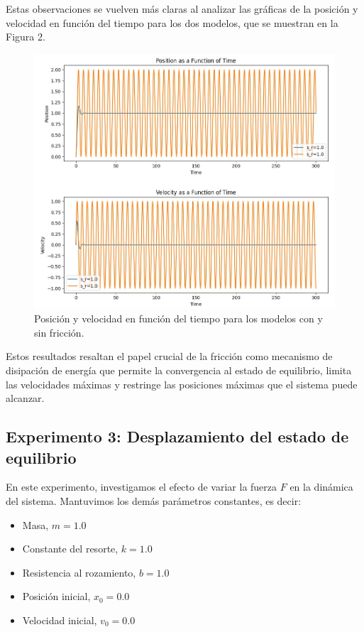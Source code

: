\documentclass[]{article}
\begin{document}
Estas observaciones se vuelven más claras al analizar las gráficas de la posición y velocidad en función del tiempo para los dos modelos, que se muestran en la Figura 2. 


\begin{figure}[H]
\centering
\includegraphics[width=\textwidth]{../assets/figure_2_friction.jpeg}
\caption{Posición y velocidad en función del tiempo para los modelos con y sin fricción.}
\end{figure}

Estos resultados resaltan el papel crucial de la fricción como mecanismo de disipación de energía que permite la convergencia al estado de equilibrio, limita las velocidades máximas y restringe las posiciones máximas que el sistema puede alcanzar.

\subsection{Experimento 3: Desplazamiento del estado de equilibrio}

En este experimento, investigamos el efecto de variar la fuerza $F$ en la dinámica del sistema. Mantuvimos los demás parámetros constantes, es decir:

\begin{itemize}
\item Masa, $m = 1.0$
\item Constante del resorte, $k = 1.0$
\item Resistencia al rozamiento, $b = 1.0$
\item Posición inicial, $x_0 = 0.0$
\item Velocidad inicial, $v_0 = 0.0$
\end{itemize}
\end{document}
